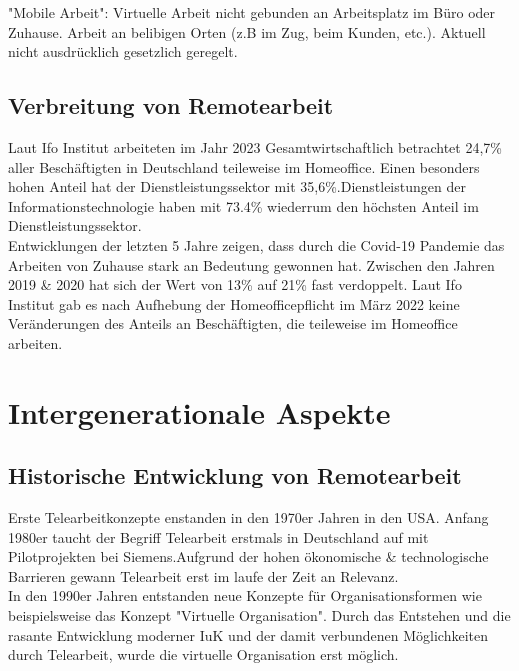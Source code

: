 \documentclass[runningheads]{llncs}
\begin{document}
"Mobile Arbeit": Virtuelle Arbeit nicht gebunden an Arbeitsplatz im Büro oder Zuhause\cite{bundestag}. Arbeit an belibigen Orten (z.B im Zug, beim Kunden, etc.). Aktuell nicht ausdrücklich gesetzlich geregelt\cite{bundestag}.

\subsection{Verbreitung von Remotearbeit}
Laut Ifo Institut arbeiteten im Jahr 2023 Gesamtwirtschaftlich betrachtet 24,7\% aller Beschäftigten in Deutschland teileweise im Homeoffice\cite{ifo23}. Einen besonders hohen Anteil hat der Dienstleistungssektor mit 35,6\%\cite{ifo23}.Dienstleistungen der Informationstechnologie haben mit 73.4\% wiederrum den höchsten Anteil im Dienstleistungssektor\cite{ifo23}.\\
Entwicklungen der letzten 5 Jahre zeigen, dass durch die Covid-19 Pandemie das Arbeiten von Zuhause stark an Bedeutung gewonnen hat. Zwischen den Jahren 2019 \& 2020 hat sich der Wert von 13\% auf 21\% fast verdoppelt\cite{StatistischesBundesamt}. Laut Ifo Institut gab es nach Aufhebung der Homeofficepflicht im März 2022 keine Veränderungen des Anteils an Beschäftigten, die teileweise im Homeoffice arbeiten\cite{ifo23}.

\section{Intergenerationale Aspekte}

\subsection{Historische Entwicklung von Remotearbeit}
Erste Telearbeitkonzepte enstanden in den 1970er Jahren in den USA\cite{Dangelmaier.1999}. Anfang 1980er taucht der Begriff Telearbeit erstmals in Deutschland auf mit Pilotprojekten bei Siemens\cite{Dangelmaier.1999}.Aufgrund der hohen ökonomische \& technologische Barrieren gewann Telearbeit erst im laufe der Zeit an Relevanz\cite{Dangelmaier.1999}.\\
In den 1990er Jahren entstanden neue Konzepte für Organisationsformen wie beispielsweise das Konzept "Virtuelle Organisation"\cite{Siedenbiedel.2020}. Durch das Entstehen und die rasante Entwicklung moderner IuK und der damit verbundenen Möglichkeiten durch Telearbeit, wurde die virtuelle Organisation erst möglich\cite{Siedenbiedel.2020}.
\end{document}
